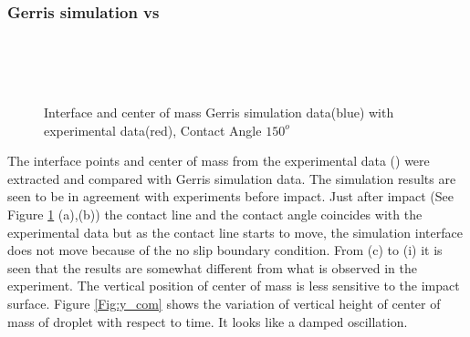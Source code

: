 \subsubsection{\textbf{Gerris simulation vs \cite{Hung2011}}}
\begin{figure}
 \centering
       \\
       \\
       \\
 \caption{Interface and center of mass Gerris simulation data(blue) with \cite{Hung2011} experimental data(red), Contact Angle $150^o$}
 \label{Fig:gs5}
 \end{figure}

The interface points and center of mass from the experimental data (\cite{Hung2011}) were extracted and compared with Gerris simulation data. 
The simulation results are seen to be in agreement with experiments before impact. Just after impact (See Figure \ref{Fig:gs5} (a),(b)) the contact line and the contact angle coincides with 
the experimental data but as the contact line starts to move, the simulation interface does not move because of the no slip boundary condition. From (c) to (i) it is seen that
the results are somewhat different from what is observed in the experiment. The vertical position of center of mass is less sensitive to the impact surface.
Figure \ref{Fig:y_com} shows the variation of vertical height of center of mass of droplet with respect to time. It looks like a damped oscillation.

